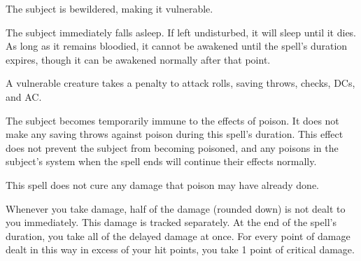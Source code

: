 \spellrng{\rngmed}
\spelldur{\durlong}
\begin{spellhealthy}
  The subject is bewildered, making it vulnerable.
\end{spellhealthy}
\begin{spellblood}
  The subject immediately falls asleep. If left undisturbed, it will sleep until it dies. As long as it remains bloodied, it cannot be awakened until the spell's duration expires, though it can be awakened normally after that point.
\end{spellblood}
\begin{spellnotes}
  A vulnerable creature takes a  penalty to attack rolls, saving throws, checks, DCs, and AC.
\end{spellnotes}

\spellrng{\rngclose}
\spelldur{\durshort}
\begin{spelleffect}
  The subject becomes temporarily immune to the effects of poison. It does not make any saving throws against poison during this spell's duration. This effect does not prevent the subject from becoming poisoned, and any poisons in the subject's system when the spell ends will continue their effects normally. 
\end{spelleffect}
\begin{spellnotes}
  This spell does not cure any damage that poison may have already done.
\end{spellnotes}

\spelldur{\durmed}
\begin{spelleffect}
    Whenever you take damage, half of the damage (rounded down) is not dealt to you immediately. This damage is tracked separately. At the end of the spell's duration, you take all of the delayed damage at once. For every point of damage dealt in this way in excess of your hit points, you take 1 point of critical damage.
\end{spelleffect}

